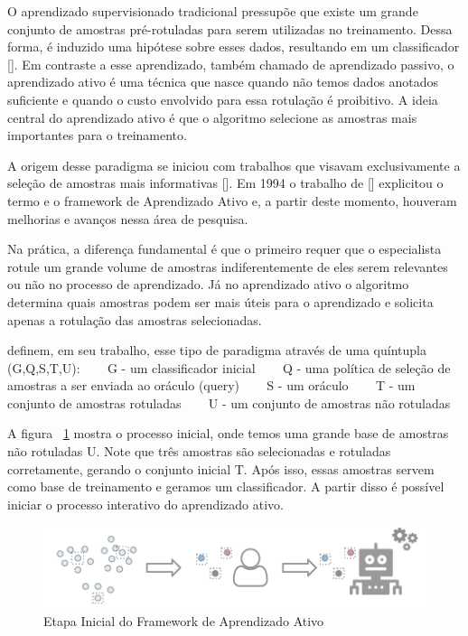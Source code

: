 O aprendizado supervisionado tradicional pressupõe que existe um grande conjunto de amostras pré-rotuladas para serem utilizadas no treinamento. Dessa forma, é induzido uma hipótese sobre esses dados, resultando em um classificador [\cite{settles2014active}]. Em contraste a esse aprendizado, também chamado de aprendizado passivo, o aprendizado ativo  é uma técnica que nasce quando não temos dados anotados suficiente e quando o custo envolvido para essa rotulação é proibitivo. A ideia central do aprendizado ativo é que o algoritmo selecione as amostras mais importantes para o treinamento. 


A origem desse paradigma se iniciou com trabalhos que visavam exclusivamente a seleção de amostras mais informativas [\cite{angluin1988queries, baum1992query, atlas1990training}]. Em 1994 o trabalho de [\cite{cohn1994improving}] explicitou o termo e o framework de Aprendizado Ativo e, a partir deste momento, houveram melhorias e avanços nessa área de pesquisa. 


Na prática, a diferença fundamental é que o primeiro requer que o especialista rotule um grande volume de amostras indiferentemente de eles serem relevantes ou não no processo de aprendizado. Já no aprendizado ativo o algoritmo determina quais amostras podem ser mais úteis para o aprendizado e solicita apenas a rotulação das amostras selecionadas. 

\cite{persello2012active} definem, em seu trabalho, esse tipo de paradigma através de uma quíntupla (G,Q,S,T,U):
\newline
\newline
~~~ G - um classificador inicial 
\newline
~~~ Q - uma política de seleção de amostras a ser enviada ao oráculo (query)
\newline 
~~~ S - um oráculo
\newline 
~~~ T - um conjunto de amostras rotuladas
\newline 
~~~ U - um conjunto de amostras não rotuladas


A figura ~\ref{fig:framework_AL_classico_etapa_inicial} mostra o processo inicial, onde temos uma grande base de amostras não rotuladas U. Note que três amostras são selecionadas e rotuladas corretamente, gerando o conjunto inicial T. Após isso, essas amostras servem como base de treinamento e geramos um classificador. A partir disso é possível iniciar o processo interativo do aprendizado ativo.


\begin{figure}
  \centering
  \includegraphics[width=.9\textwidth]{figures/Framework_processo_inicial.png}
  \caption{Etapa Inicial do Framework de Aprendizado Ativo}
  \label{fig:framework_AL_classico_etapa_inicial}
\end{figure}


